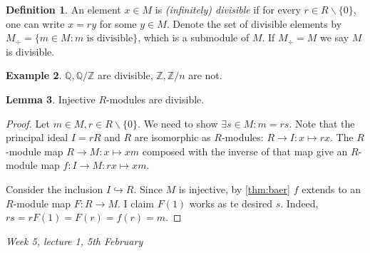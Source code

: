 \documentclass{article}
\newcommand{\Z}{\mathbb{Z}}
\newcommand{\Q}{\mathbb{Q}}
\theoremstyle{definition}
\newtheorem{defn}{Definition}[subsection]
\newtheorem{lemma}[defn]{Lemma}
\newtheorem{example}[defn]{Example}
\begin{document}
\begin{defn}
An element $x\in M$ is \textit{(infinitely) divisible} if for every $r\in R\backslash\{0\}$, one can write $x=ry$ for some $y\in M$. Denote the set of divisible elements by $M_\div=\{m\in M:m\text{ is divisible}\}$, which is a submodule of $M$. If $M_\div=M$ we say $M$ is divisible.
\end{defn}

\begin{example}
$\Q,\Q/\Z$ are divisible, $\Z,\Z/n$ are not.
\end{example}

\begin{lemma}
\label{lemma:injmodarediv}
Injective $R$-modules are divisible.
\end{lemma}
\begin{proof}
Let $m\in M,r\in R\backslash\{0\}$. We need to show $\exists s\in M:m=rs$. Note that the principal ideal $I=rR$ and $R$ are isomorphic as $R$-modules: $R\rightarrow I:x\mapsto rx$. The $R$-module map $R\rightarrow M:x\mapsto xm$ composed with the inverse of that map give an $R$-module map $f:I\rightarrow M:rx\mapsto xm$.

Consider the inclusion $I\hookrightarrow R$. Since $M$ is injective, by \ref{thm:baer} $f$ extends to an $R$-module map $F:R\rightarrow M$. I claim $F(1)$ works as te desired $s$. Indeed, $rs=rF(1)=F(r)=f(r)=m$.
\end{proof}

\begin{flushright}
\textit{Week 5, lecture 1, 5th February}
\end{flushright}
\end{document}
